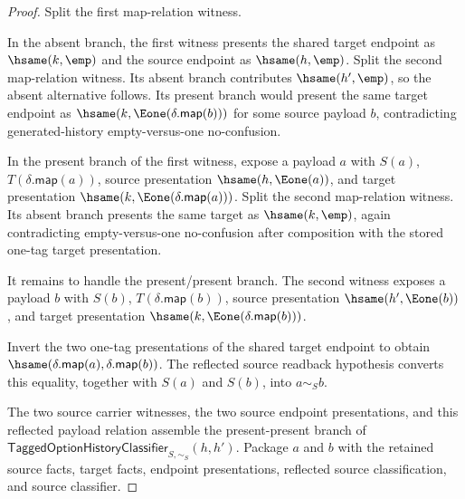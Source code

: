 \begin{proof}
Split the first map-relation witness.

In the absent branch, the first witness presents the shared target endpoint as
$\hsame(k,\emp)$ and the source endpoint as $\hsame(h,\emp)$. Split the second
map-relation witness. Its absent branch contributes $\hsame(h',\emp)$, so the
absent alternative follows. Its present branch would present the same target
endpoint as $\hsame(k,\Eone(\delta.\mathsf{map}(b)))$ for some source payload
$b$, contradicting generated-history empty-versus-one no-confusion.

In the present branch of the first witness, expose a payload $a$ with $S(a)$,
$T(\delta.\mathsf{map}(a))$, source presentation $\hsame(h,\Eone(a))$, and
target presentation $\hsame(k,\Eone(\delta.\mathsf{map}(a)))$. Split the
second map-relation witness. Its absent branch presents the same target as
$\hsame(k,\emp)$, again contradicting empty-versus-one no-confusion after
composition with the stored one-tag target presentation.

It remains to handle the present/present branch. The second witness exposes a
payload $b$ with $S(b)$, $T(\delta.\mathsf{map}(b))$, source presentation
$\hsame(h',\Eone(b))$, and target presentation
$\hsame(k,\Eone(\delta.\mathsf{map}(b)))$.

Invert the two one-tag presentations of the shared target endpoint to obtain
$\hsame(\delta.\mathsf{map}(a),\delta.\mathsf{map}(b))$. The reflected source
readback hypothesis converts this equality, together with $S(a)$ and $S(b)$,
into $a\sim_S b$.

The two source carrier witnesses, the two source endpoint presentations, and
this reflected payload relation assemble the present-present branch of
$\mathsf{TaggedOptionHistoryClassifier}_{S,\sim_S}(h,h')$. Package $a$ and $b$
with the retained source facts, target facts, endpoint presentations, reflected
source classification, and source classifier.
\end{proof}

